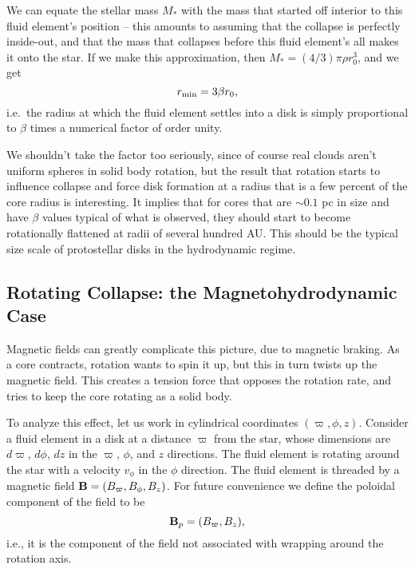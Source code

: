 We can equate the stellar mass $M_*$ with the mass that started off interior to this fluid element's position -- this amounts to assuming that the collapse is perfectly inside-out, and that the mass that collapses before this fluid element's all makes it onto the star. If we make this approximation, then $M_*=(4/3)\pi \rho r_0^3$, and we get
\begin{equation}
r_{\rm min} = 3 \beta r_0,
\end{equation}
i.e.\ the radius at which the fluid element settles into a disk is simply proportional to $\beta$ times a numerical factor of order unity.

We shouldn't take the factor too seriously, since of course real clouds aren't uniform spheres in solid body rotation, but the result that rotation starts to influence collapse and force disk formation at a radius that is a few percent of the core radius is interesting. It implies that for cores that are $\sim 0.1$ pc in size and have $\beta$ values typical of what is observed, they should start to become rotationally flattened at radii of several hundred AU. This should be the typical size scale of protostellar disks in the hydrodynamic regime.

\subsection{Rotating Collapse: the Magnetohydrodynamic Case}

Magnetic fields can greatly complicate this picture, due to magnetic braking. As a core contracts, rotation wants to spin it up, but this in turn twists up the magnetic field. This creates a tension force that opposes the rotation rate, and tries to keep the core rotating as a solid body.

To analyze this effect, let us work in cylindrical coordinates $(\varpi, \phi, z)$. Consider a fluid element in a disk at a distance $\varpi$ from the star, whose dimensions are $d\varpi$, $d\phi$, $dz$ in the $\varpi$, $\phi$, and $z$ directions. The fluid element is rotating around the star with a velocity $v_{\phi}$ in the $\phi$ direction. The fluid element is threaded by a magnetic field $\mathbf{B}=(B_\varpi, B_\phi, B_z)$. For future convenience we define the poloidal component of the field to be
\begin{equation}
\mathbf{B}_p = (B_\varpi, B_z),
\end{equation}
i.e., it is the component of the field not associated with wrapping around the rotation axis.


